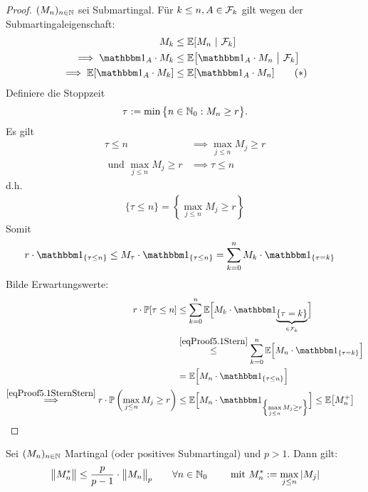 \begin{proof}
$(M_n)_{n\in\mathbb{N}}$ sei Submartingal. Für $k\leq n,A\in\mathcal{F}_k$ gilt wegen der Submartingaleigenschaft:
\begin{align}
M_k&\leq\E[M_n~|~\F_k]\nonumber\\
\implies\indi_A\cdot M_k &\leq\E\big[\indi_A\cdot M_n~\big|~\F_k\big]\nonumber\\
\implies\E[\indi_A\cdot M_k]&\leq\E[\indi_A\cdot M_n]\label{eqProof5.1Stern}\tag{$\ast$}
\end{align}
Definiere die Stoppzeit
\begin{align*}
\tau:=\min\big\lbrace n\in\mathbb{N}_0:M_n\geq r\big\rbrace.
\end{align*}
Es gilt
\begin{align*}
\tau\leq n&\implies \max\limits_{j\leq n} M_j\geq r\\
\text{ und } \max\limits_{j\leq n} M_j\geq r&\implies\tau\leq n
\end{align*}
d.h.
\begin{align}\label{eqProof5.1SternStern}\tag{$\ast\ast$}
\lbrace\tau\leq n\rbrace=\left\lbrace\max\limits_{j\leq n} M_j\geq r\right\rbrace
\end{align}
Somit
\begin{align*}
r\cdot\indi_{\lbrace\tau\leq n\rbrace}
&\leq M_\tau\cdot\indi_{\lbrace\tau\leq n\rbrace}
=\sum\limits_{k=0}^n M_k\cdot\indi_{\lbrace\tau=k\rbrace}
\end{align*}
Bilde Erwartungswerte:
\begin{align*}
r\cdot\P[\tau\leq n]
&\leq\sum\limits_{k=0}^n\E\Big[M_k\cdot\indi_{\underbrace{\lbrace\tau=k\rbrace}_{\in\F_k}}\Big]\\
&\stackrel{\eqref{eqProof5.1Stern}}{\leq}
\sum\limits_{k=0}^n\E\Big[M_n\cdot\indi_{\lbrace\tau=k\rbrace}\Big]\\
&=\E\Big[M_n\cdot\indi_{\lbrace\tau\leq n\rbrace}\Big]\\
\stackrel{\eqref{eqProof5.1SternStern}}{\implies}
r\cdot\P\left(\max\limits_{j\leq n} M_j\geq r\right)
&\leq\E\Big[M_n\cdot\indi_{\left\lbrace\max\limits_{j\leq n} M_j\geq r\right\rbrace}\Big]
\leq\E\big[M_n^+\big]
\end{align*}
\end{proof}

\begin{theorem}[$L_p$-Ungleichung]\label{theorem5.2LpUngleichung}\enter
Sei $(M_n)_{n\in\mathbb{N}}$ Martingal (oder positives Submartingal) und $p>1$. Dann gilt:
\begin{align*}
\big\Vert M_n^\ast\big\Vert\leq\frac{p}{p-1}\cdot\big\Vert M_n\big\Vert_p\qquad\forall n\in\mathbb{N}_0\qquad\text{ mit } M_n^\ast:=\max\limits_{j\leq n}|M_j|
\end{align*}
\end{theorem}
